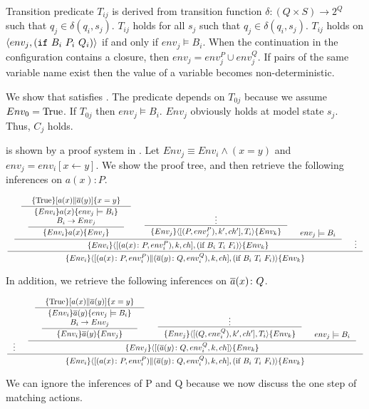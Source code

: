 \documentclass[12pt,a4paper,titlepage]{article}
\theoremstyle{break}
\begin{document}
Transition predicate \(T_{ij}\) is derived from transition function \(\delta: (Q\times S)\rightarrow 2^Q\) such that \(q_j\in\delta(q_i,s_j)\).
\(T_{ij}\) holds for all \(s_j\) such that \(q_j\in\delta(q_i,s_j)\).
\(T_{ij}\) holds on \(\langle env_j, ({\tt if}\ B_i\ P_i\ Q_i)\rangle\) if and only if \(env_j\models B_i\).
When the continuation in the configuration contains a closure, then \(env_j=env_j^P\cup env_j^Q\).
If pairs of the same variable name exist then the value of a variable becomes non-deterministic.

We show that \NHK satisfies .
The predicate depends on \(T_{0j}\) because we assume \(Env_0=\mathop{\mathrm{True}}\nolimits\).
If \(T_{0j}\) then \(env_j\models B_i\).
\(Env_j\) obviously holds at model state \(s_j\).
Thus, \(C_j\) holds.

 is shown by a proof system in .
Let \(Env_j\equiv Env_i\wedge(x=y)\) and \(env_j=env_i[x\leftarrow y]\).
We show the proof tree, and then retrieve the following inferences on \(a(x)\colon P\).
  \begin{center}
    \begin{math}
\inference{
  \inference{
    \inference{\{\Truerm\}[a(x)\|\bijection{a}(y)]\{x=y\}}
    {\inference{\{Env_i\}a(x)\{env_j\models B_i\}\\
                  B_i\rightarrow Env_j} {\{Env_i\}a(x)\{Env_j\}}}&
     \inference{\vdots}
     {\{Env_j\}\langle[(P,env_j^P),k',ch'],T_i\rangle\{Env_k\}}&env_j\models B_i}
  {\{Env_i\}\langle[(a(x)\colon P,env_i^P),k,ch],(\mbox{if}\ B_i\ T_i\ F_i)\rangle\{Env_k\}}&\vdots}
{\{Env_i\}\langle[(a(x)\colon P,env_i^P)\|(\bijection{a}(y)\colon Q,env_i^Q),k,ch],(\mbox{if}\ B_i\ T_i\ F_i)\rangle\{Env_k\}}
    \end{math}
  \end{center}
In addition, we retrieve the following inferences on \(\mbox{$\overline{a}$}(x)\colon Q\).
  \begin{center}
    \begin{math}
\inference{
  \vdots&
    \inference{\inference{\{\Truerm\}[a(x)\|\bijection{a}(y)]\{x=y\}}
               {\inference{\{Env_i\}\bijection{a}(y)\{env_j\models B_i\}\\B_i\rightarrow Env_j}
                {\{Env_i\}\bijection{a}(y)\{Env_j\}}}&
                   \inference{\vdots}
                   {\{Env_j\}\langle[(Q,env_i^Q),k',ch'],T_i\rangle\{Env_k\}}&env_j\models B_i}
   {\{Env_j\}\langle[(\bijection{a}(y)\colon Q,env_i^Q,k,ch]\rangle\{Env_k\}}}
{\{Env_i\}\langle[(a(x)\colon P,env_i^P)\|(\bijection{a}(y)\colon Q,env_i^Q),k,ch],(\mbox{if}\ B_i\ T_i\ F_i)\rangle\{Env_k\}}
    \end{math}
  \end{center}
We can ignore the inferences of P and Q because we now discuss the one step of matching actions.
\end{document}

